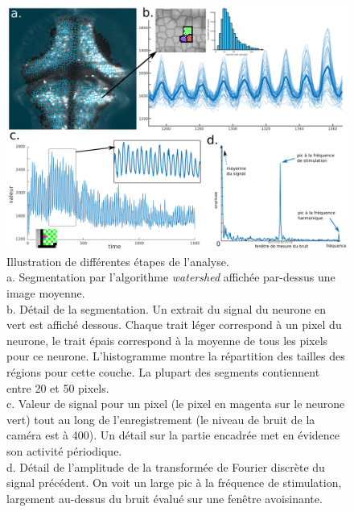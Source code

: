 \begin{figure}
\centering
\includegraphics[width=1\textwidth]{./files/analysis_illustration.svg.png}
\caption{Illustration de différentes étapes de l'analyse.
\\a. Segmentation par l'algorithme \emph{watershed} affichée par-dessus une image moyenne.
\\b. Détail de la segmentation. Un extrait du signal du neurone en vert est affiché dessous. Chaque trait léger correspond à un pixel du neurone, le trait épais correspond à la moyenne de tous les pixels pour ce neurone. L'histogramme montre la répartition des tailles des régions pour cette couche. La plupart des segments contiennent entre 20 et 50 pixels.
\\c. Valeur de signal pour un pixel (le pixel en magenta sur le neurone vert) tout au long de l'enregistrement (le niveau de bruit de la caméra est à 400). Un détail sur la partie encadrée met en évidence son activité périodique.
\\d. Détail de l'amplitude de la transformée de Fourier discrète du signal précédent. On voit un large pic à la fréquence de stimulation, largement au-dessus du bruit évalué sur une fenêtre avoisinante.
\label{FIGfourier}}
\end{figure}    


